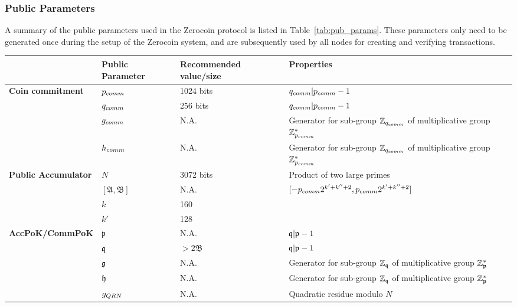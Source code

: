\subsubsection{Public Parameters}
\label{sec:3-Public Parameters}
A summary of the public parameters used in the Zerocoin protocol is listed in Table~\ref{tab:pub_params}. These parameters only need to be generated once during the setup of the Zerocoin system, and are subsequently used by all nodes for creating and verifying transactions. 

\begin{table}[H]
	\centering \small
	\begin{tabular}{ l | m{2cm} | m{2.5cm} | m{5.5cm} }
		
		& \textbf{Public Parameter} & \textbf{Recommended value/size} & \textbf{Properties}\\ 		
		\hline
		\hline
		\multirow{4}{*}{\textbf{Coin commitment}} 
		& $p_{comm}$ & 1024 bits & $q_{comm}|p_{comm}-1$ \\
		& $q_{comm}$ & 256 bits & $q_{comm}|p_{comm}-1$ \\
		& $g_{comm}$ & N.A. & Generator for sub-group $\mathbb{Z}_{q_{comm}}$ of multiplicative group $\mathbb{Z}_{p_{comm}}^{*}$ \\
		& $h_{comm}$ & N.A. & Generator for sub-group $\mathbb{Z}_{q_{comm}}$ of multiplicative group $\mathbb{Z}_{p_{comm}}^{*}$ \\
		\hline
		\multirow{4}{*}{\textbf{Public Accumulator}}
		& $N$ & 3072 bits & Product of two large primes \\
		& $[\mathfrak{A},\mathfrak{B}]$ & N.A. & $[-p_{comm}2^{k'+k''+2},p_{comm}2^{k'+k''+2}]$ \\
		& $k$ & 160 & \\
		& $k'$ & 128 & \\
		\hline
		\multirow{6}{*}{\textbf{AccPoK/CommPoK}} 
		& $\mathfrak{p}$ & N.A.& $\mathfrak{q}|\mathfrak{p}-1$ \\
		& $\mathfrak{q}$ & $>2\mathfrak{B}$ & $\mathfrak{q}|\mathfrak{p}-1$ \\
		& $\mathfrak{g}$ & N.A. & Generator for sub-group $\mathbb{Z}_{\mathfrak{q}}$ of multiplicative group $\mathbb{Z}_{\mathfrak{p}}^{*}$ \\
		& $\mathfrak{h}$ & N.A. & Generator for sub-group $\mathbb{Z}_{\mathfrak{q}}$ of multiplicative group $\mathbb{Z}_{\mathfrak{p}}^{*}$ \\
		& $g_{QRN}$ & N.A. & Quadratic residue modulo $N$ \\

\end{tabular}
\end{table}
